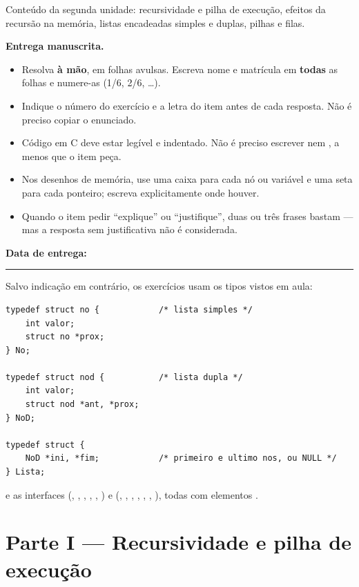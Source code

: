 \documentclass[11pt,a4paper]{article}
\begin{document}
     {Conteúdo da segunda unidade: recursividade e pilha de execução, efeitos da
      recursão na memória, listas encadeadas simples e duplas, pilhas e filas.}

\begin{destaque}
\textbf{Entrega manuscrita.}
\begin{itemize}[leftmargin=1.2em,itemsep=1pt,topsep=3pt]
  \item Resolva \textbf{à mão}, em folhas avulsas. Escreva nome e matrícula em
        \textbf{todas} as folhas e numere-as (1/6, 2/6, \dots).
  \item Indique o número do exercício e a letra do item antes de cada resposta.
        Não é preciso copiar o enunciado.
  \item Código em C deve estar legível e indentado. Não é preciso escrever
         nem , a menos que o item peça.
  \item Nos desenhos de memória, use uma caixa para cada nó ou variável e uma seta
        para cada ponteiro; escreva  explicitamente onde houver.
  \item Quando o item pedir ``explique'' ou ``justifique'', duas ou três frases
        bastam --- mas a resposta sem justificativa não é considerada.
\end{itemize}
\vspace{4pt}
\textbf{Data de entrega:} \rule{4cm}{0.4pt}
\end{destaque}

\noindent Salvo indicação em contrário, os exercícios usam os tipos vistos em aula:

\begin{lstlisting}
typedef struct no {            /* lista simples */
    int valor;
    struct no *prox;
} No;

typedef struct nod {           /* lista dupla */
    int valor;
    struct nod *ant, *prox;
} NoD;

typedef struct {
    NoD *ini, *fim;            /* primeiro e ultimo nos, ou NULL */
} Lista;
\end{lstlisting}

\noindent e as interfaces  (, ,
, , , ) e 
(, , , ,
, , ), todas com elementos .

\section{Parte I --- Recursividade e pilha de execução}
\end{document}
